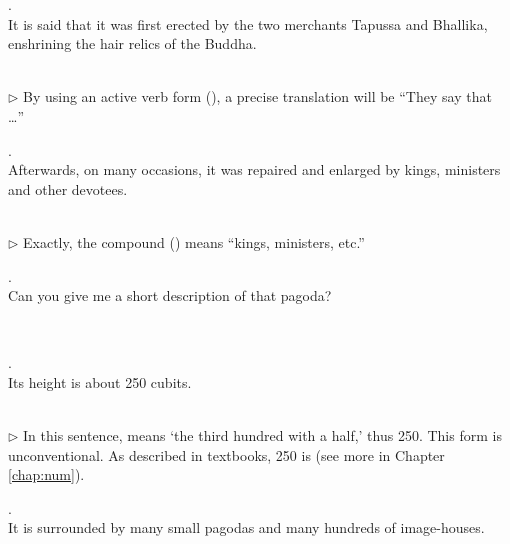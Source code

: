 \medskip
\parbox[lt]{0.93\linewidth}{\raggedright{}. \\
\hspace*{6mm}It is said that it was first erected by the two merchants Tapussa and Bhallika, enshrining the hair relics of the Buddha.}\\[1mm]
{\small $\triangleright$ By using an active verb form (), a precise translation will be ``They say that \ldots''}

\medskip
\parbox[lt]{0.93\linewidth}{\raggedright{}. \\
\hspace*{6mm}Afterwards, on many occasions, it was repaired and enlarged by kings, ministers and other devotees.}\\[1mm]
{\small $\triangleright$ Exactly, the compound  () means ``kings, ministers, etc.''}

\medskip
\parbox[lt]{0.93\linewidth}{\raggedright{}. \\
\hspace*{6mm}Can you give me a short description of that pagoda?}\\[1mm]

\medskip
\parbox[lt]{0.93\linewidth}{\raggedright{}. \\
\hspace*{6mm}Its height is about 250 cubits.}\\[1mm]
{\small $\triangleright$ In this sentence,  means `the third hundred with a half,' thus 250. This form is unconventional. As described in textbooks, 250 is  (see more in Chapter \ref{chap:num}).}

\medskip
\parbox[lt]{0.93\linewidth}{\raggedright{}. \\
\hspace*{6mm}It is surrounded by many small pagodas and many hundreds of image-houses.}\\[1mm]

